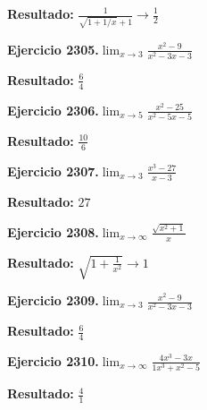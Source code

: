 \documentclass[10pt,a4paper]{article}
\begin{document}
\begin{solbox}
\textbf{Resultado:} \(\displaystyle \frac{1}{\sqrt{1+1/x}+1} \to \frac{1}{2}\)
\end{solbox}

\begin{ejbox}
\textbf{Ejercicio 2305.}\quad $\lim_{x\to 3} \frac{x^2-9}{x^2-3x-3}$
\end{ejbox}

\begin{solbox}
\textbf{Resultado:} \(\displaystyle \frac{6}{4}\)
\end{solbox}

\newpage
\begin{ejbox}
\textbf{Ejercicio 2306.}\quad $\lim_{x\to 5} \frac{x^2-25}{x^2-5x-5}$
\end{ejbox}

\begin{solbox}
\textbf{Resultado:} \(\displaystyle \frac{10}{6}\)
\end{solbox}

\begin{ejbox}
\textbf{Ejercicio 2307.}\quad $\lim_{x\to 3} \frac{x^3-27}{x-3}$
\end{ejbox}

\begin{solbox}
\textbf{Resultado:} \(\displaystyle 27\)
\end{solbox}

\begin{ejbox}
\textbf{Ejercicio 2308.}\quad $\lim_{x\to \infty} \frac{\sqrt{x^2+1}}{x}$
\end{ejbox}

\begin{solbox}
\textbf{Resultado:} \(\displaystyle \sqrt{1+\frac{1}{x^2}} \to 1\)
\end{solbox}

\newpage
\begin{ejbox}
\textbf{Ejercicio 2309.}\quad $\lim_{x\to 3} \frac{x^2-9}{x^2-3x-3}$
\end{ejbox}

\begin{solbox}
\textbf{Resultado:} \(\displaystyle \frac{6}{4}\)
\end{solbox}

\begin{ejbox}
\textbf{Ejercicio 2310.}\quad $\lim_{x\to \infty} \frac{4x^3 - 3x}{1x^3 + x^2 - 5}$
\end{ejbox}

\begin{solbox}
\textbf{Resultado:} \(\displaystyle \frac{4}{1}\)
\end{solbox}
\end{document}
